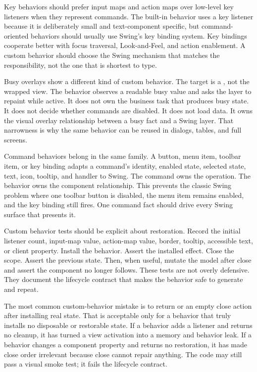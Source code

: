 Key behaviors should prefer input maps and action maps over low-level key
listeners when they represent commands. The built-in 
behavior uses a key listener because it is deliberately small and text-component
specific, but command-oriented behaviors should usually use Swing's key binding
system. Key bindings cooperate better with focus traversal, Look-and-Feel, and
action enablement. A custom behavior should choose the Swing mechanism that
matches the responsibility, not the one that is shortest to type.

Busy overlays show a different kind of custom behavior. The target is a
, not the wrapped view. The behavior observes a readable busy value
and asks the layer to repaint while active. It does not own the business task
that produces busy state. It does not decide whether commands are disabled. It
does not load data. It owns the visual overlay relationship between a busy fact
and a Swing layer. That narrowness is why the same behavior can be reused in
dialogs, tables, and full screens.

Command behaviors belong in the same family. A button, menu item, toolbar
item, or key binding adapts a command's identity, enabled state, selected state,
text, icon, tooltip, and handler to Swing. The command owns the operation. The
behavior owns the component relationship. This prevents the classic Swing
problem where one toolbar button is disabled, the menu item remains enabled,
and the key binding still fires. One command fact should drive every Swing
surface that presents it.

Custom behavior tests should be explicit about restoration. Record the initial
listener count, input-map value, action-map value, border, tooltip, accessible
text, or client property. Install the behavior. Assert the installed effect.
Close the scope. Assert the previous state. Then, when useful, mutate the model
after close and assert the component no longer follows. These tests are not
overly defensive. They document the lifecycle contract that makes the behavior
safe to generate and repeat.

The most common custom-behavior mistake is to return  or an
empty close action after installing real state. That is acceptable only for a
behavior that truly installs no disposable or restorable state. If a behavior
adds a listener and returns no cleanup, it has turned a view activation into a
memory and behavior leak. If a behavior changes a component property and
returns no restoration, it has made close order irrelevant because close cannot
repair anything. The code may still pass a visual smoke test; it fails the
lifecycle contract.

